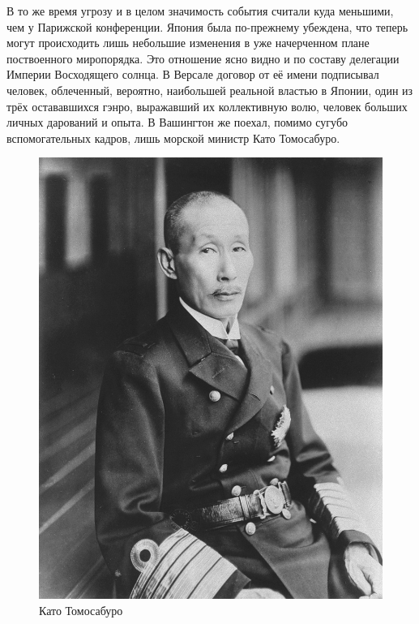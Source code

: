 В то же время угрозу и в целом значимость события считали куда меньшими, чем у Парижской конференции. Япония была по-прежнему убеждена, что теперь могут происходить лишь небольшие изменения в уже начерченном плане поствоенного миропорядка. Это отношение ясно видно и по составу делегации Империи Восходящего солнца. В Версале договор от её имени подписывал человек, облеченный, вероятно, наибольшей реальной властью в Японии, один из трёх остававшихся гэнро, выражавший их коллективную волю, человек больших личных дарований и опыта. В Вашингтон же поехал, помимо сугубо вспомогательных кадров, лишь морской министр Като Томосабуро. 

\begin{figure}[h!tb] 
	\centering\includegraphics[scale=0.3]{Glava6/EVMZtG3m7CE.jpg}
	\caption{Като Томосабуро}%
\end{figure}

